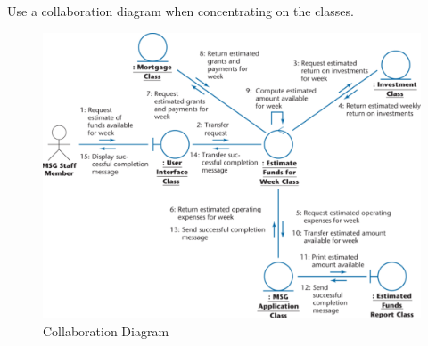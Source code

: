 \documentclass[11pt]{article}
\begin{document}
Use a collaboration diagram when concentrating on the classes.

\begin{figure}[h]
	\centering
	\includegraphics[width=0.7\linewidth]{images/CollaborationDiagram.png}
	\caption{Collaboration Diagram}
	\label{fig:CollaborationDiagram}
\end{figure}
\end{document}
